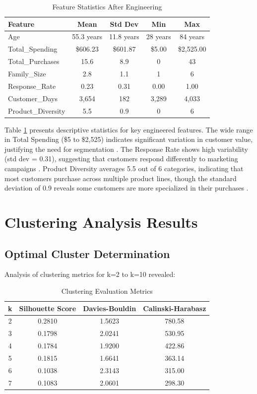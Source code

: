 \documentclass[12pt,a4paper]{report}
\begin{document}
\begin{table}[htbp]
\caption{Feature Statistics After Engineering}
\label{tab:feature_statistics}
\centering
\small
\begin{tabular}{|l|c|c|c|c|}
\hline
\textbf{Feature} & \textbf{Mean} & \textbf{Std Dev} & \textbf{Min} & \textbf{Max} \\
\hline
Age & 55.3 years & 11.8 years & 28 years & 84 years \\
\hline
Total\_Spending & \$606.23 & \$601.87 & \$5.00 & \$2,525.00 \\
\hline
Total\_Purchases & 15.6 & 8.9 & 0 & 43 \\
\hline
Family\_Size & 2.8 & 1.1 & 1 & 6 \\
\hline
Response\_Rate & 0.23 & 0.31 & 0.00 & 1.00 \\
\hline
Customer\_Days & 3,654 & 182 & 3,289 & 4,033 \\
\hline
Product\_Diversity & 5.5 & 0.9 & 0 & 6 \\
\hline
\end{tabular}
\end{table}

\noindent Table \ref{tab:feature_statistics} presents descriptive statistics for key engineered features. The wide range in Total Spending (\$5 to \$2,525) indicates significant variation in customer value, justifying the need for segmentation \cite{wedel2000}. The Response Rate shows high variability (std dev = 0.31), suggesting that customers respond differently to marketing campaigns \cite{kohavi2009}. Product Diversity averages 5.5 out of 6 categories, indicating that most customers purchase across multiple product lines, though the standard deviation of 0.9 reveals some customers are more specialized in their purchases \cite{schafer2007}.

\section{Clustering Analysis Results}

\subsection{Optimal Cluster Determination}
\noindent Analysis of clustering metrics for k=2 to k=10 revealed:

\begin{table}[htbp]
\caption{Clustering Evaluation Metrics}
\label{tab:clustering_metrics}
\centering
\begin{tabular}{|c|c|c|c|}
\hline
\textbf{k} & \textbf{Silhouette Score} & \textbf{Davies-Bouldin} & \textbf{Calinski-Harabasz} \\
\hline
2 & 0.2810 & 1.5623 & 780.58 \\
\hline
3 & 0.1798 & 2.0241 & 530.95 \\
\hline
4 & 0.1784 & 1.9200 & 422.86 \\
\hline
5 & 0.1815 & 1.6641 & 363.14 \\
\hline
6 & 0.1038 & 2.3143 & 315.00 \\
\hline
7 & 0.1083 & 2.0601 & 298.30 \\
\hline
\end{tabular}
\end{table}
\end{document}
